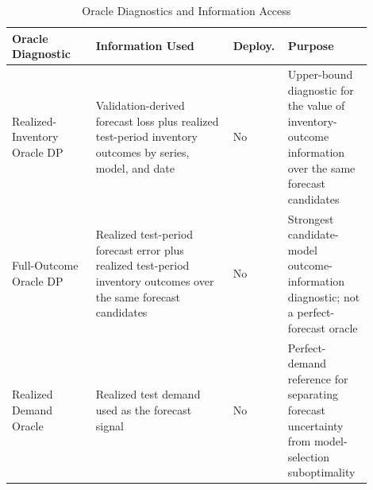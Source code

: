 \begin{table}[htbp]
\centering
\footnotesize
\setlength{\tabcolsep}{3pt}
\caption{Oracle Diagnostics and Information Access}
\label{tab:oracle-taxonomy}
\begin{tabular}{p{0.22\linewidth}p{0.36\linewidth}p{0.10\linewidth}p{0.22\linewidth}}
\toprule
\textbf{Oracle Diagnostic} & \textbf{Information Used} & \textbf{Deploy.} & \textbf{Purpose} \\
\midrule
Realized-Inventory Oracle DP & Validation-derived forecast loss plus realized test-period inventory outcomes by series, model, and date & No & Upper-bound diagnostic for the value of inventory-outcome information over the same forecast candidates \\
Full-Outcome Oracle DP & Realized test-period forecast error plus realized test-period inventory outcomes over the same forecast candidates & No & Strongest candidate-model outcome-information diagnostic; not a perfect-forecast oracle \\
Realized Demand Oracle & Realized test demand used as the forecast signal & No & Perfect-demand reference for separating forecast uncertainty from model-selection suboptimality \\
\bottomrule
\end{tabular}
\end{table}
